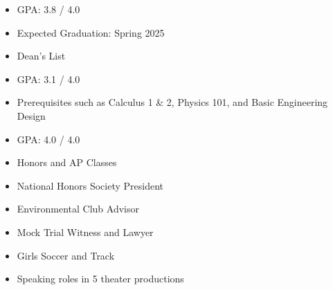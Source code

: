 

\begin{itemize}
\item GPA: 3.8 / 4.0
\item Expected Graduation: Spring 2025
\item Dean's List
\end{itemize}

\divider

\begin{itemize}
\item GPA: 3.1 / 4.0
\item Prerequisites such as Calculus 1 \& 2, Physics 101, and Basic Engineering Design
\end{itemize}

\divider

\begin{itemize}
\item GPA: 4.0 / 4.0
\item Honors and AP Classes
\item National Honors Society President
\item Environmental Club Advisor
\item Mock Trial Witness and Lawyer
\item Girls Soccer and Track
\item Speaking roles in 5 theater productions
\end{itemize}